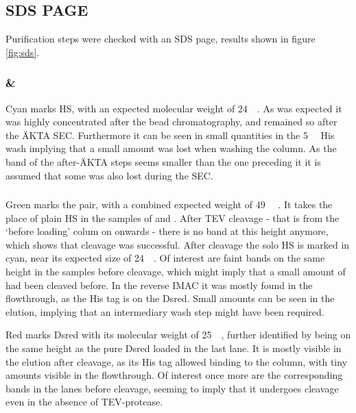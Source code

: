 \subsection{SDS PAGE}

Purification steps were checked with an SDS page, results shown in figure
\ref{fig:sds}.

\subsubsection{\hs{} \& \hsmut{}}

Cyan marks HS, with an expected molecular weight of
\SI{24}{\kilo\Da}\cite{pdb}. As was expected it was highly concentrated after
the  bead chromatography, and remained so after the ÄKTA SEC.
Furthermore it can be seen in small quantities in the \SI{5}{\milli\Molar} His
wash implying that a small amount was lost when washing the column. As the band
of the after-ÄKTA steps seems smaller than the one preceding it it is assumed
that some was also lost during the SEC.

\subsubsection{\hsdsred{}}

Green marks the \hsdsred{} pair, with a combined expected weight of
\SI{49}{\kilo\Da} \cite{pdb}. It takes the place of plain HS in the samples of
\hs{} and \hsmut{}. After TEV cleavage - that is from the `before loading' colum on
onwards - there is no band at this height anymore, which shows that cleavage
was successful. After cleavage the solo HS is marked in cyan, near its expected
size of \SI{24}{\kilo\Da}. Of interest are faint bands on the same height in
the samples before cleavage, which might imply that a small amount of \hsdsred{}
had been cleaved before. In the reverse IMAC it was mostly found in the
flowthrough, as the His tag is on the Dsred. Small amounts can be seen in the
elution, implying that an intermediary wash step might have been required.

Red marks Dsred with its molecular weight of \SI{25}{\kilo\Da}, further
identified by being on the same height as the pure Dsred loaded in the last
lane. It is mostly visible in the elution after cleavage, as its His tag
allowed binding to the column, with tiny amounts visible in the flowthrough. Of
interest once more are the corresponding bands in the lanes before cleavage,
seeming to imply that it undergoes cleavage even in the absence of
TEV-protease.

